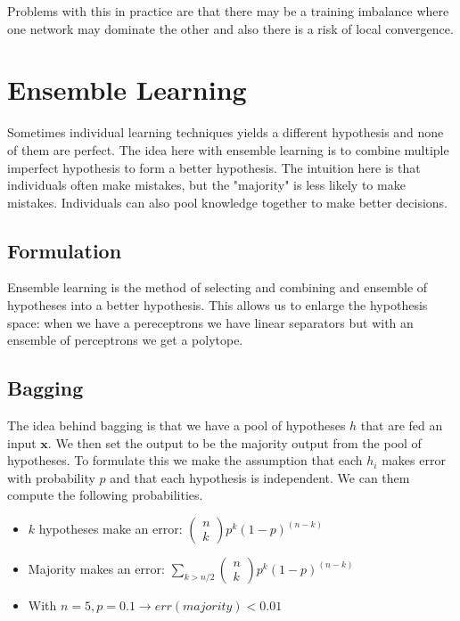 \documentclass[12pt]{article}
\begin{document}
            Problems with this in practice are that there may be a training imbalance where one network may dominate the
            other and also there is a risk of local convergence. 

\section{Ensemble Learning}
    Sometimes individual learning techniques yields a different hypothesis and none of them are perfect. The idea here
    with ensemble learning is to combine multiple imperfect hypothesis to form a better hypothesis. The intuition here
    is that individuals often make mistakes, but the "majority" is less likely to make mistakes. Individuals can also
    pool knowledge together to make better decisions.

    \subsection{Formulation}
        Ensemble learning is the method of selecting and combining and ensemble of hypotheses into a better hypothesis.
        This allows us to enlarge the hypothesis space: when we have a pereceptrons we have linear separators but with
        an ensemble of perceptrons we get a polytope.
    
    \subsection{Bagging}
        The idea behind bagging is that we have a pool of hypotheses $h$ that are fed an input $\boldsymbol{x}$. We then
        set the output to be the majority output from the pool of hypotheses. To formulate this we make the assumption
        that each $h_i$ makes error with probability $p$ and that each hypothesis is independent. We can them compute
        the following probabilities.
        
        \begin{itemize}
            \item $k$ hypotheses make an error: $\begin{pmatrix} n \\ k \end{pmatrix} p^k(1-p)^{(n-k)}$
            \item Majority makes an error: $\sum_{k>n/2} \begin{pmatrix} n \\ k \end{pmatrix} p^k(1-p)^{(n-k)}$
            \item With $n=5, p=0.1 \rightarrow err(majority) < 0.01$
        \end{itemize}
\end{document}
